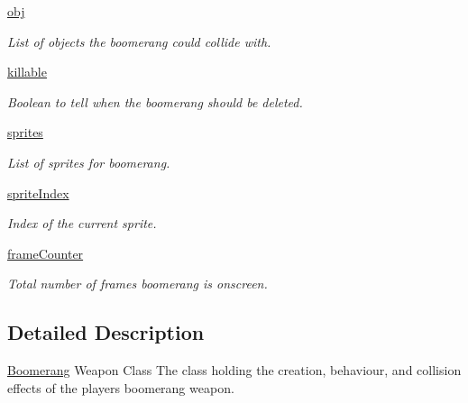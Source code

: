 \begin{DoxyCompactItemize}
\hyperlink{classactor_1_1boomerang_1_1_boomerang_a3f28b182298ed6f753bbaa2bacc50287}{obj}
\begin{DoxyCompactList}\small\item\em List of objects the boomerang could collide with. \end{DoxyCompactList}\item 
\mbox{\label{classactor_1_1boomerang_1_1_boomerang_abfb405ccedae18b49b36d5504a548aed}} 
\hyperlink{classactor_1_1boomerang_1_1_boomerang_abfb405ccedae18b49b36d5504a548aed}{killable}
\begin{DoxyCompactList}\small\item\em Boolean to tell when the boomerang should be deleted. \end{DoxyCompactList}\item 
\mbox{\label{classactor_1_1boomerang_1_1_boomerang_a54e828173053f349639a8e75b56281c6}} 
\hyperlink{classactor_1_1boomerang_1_1_boomerang_a54e828173053f349639a8e75b56281c6}{sprites}
\begin{DoxyCompactList}\small\item\em List of sprites for boomerang. \end{DoxyCompactList}\item 
\mbox{\label{classactor_1_1boomerang_1_1_boomerang_affb047b1f34deb8f68d0d6d5ee499429}} 
\hyperlink{classactor_1_1boomerang_1_1_boomerang_affb047b1f34deb8f68d0d6d5ee499429}{sprite\+Index}
\begin{DoxyCompactList}\small\item\em Index of the current sprite. \end{DoxyCompactList}\item 
\mbox{\label{classactor_1_1boomerang_1_1_boomerang_ae815f4dbc9a5e7c3d8e4596c41001c70}} 
\hyperlink{classactor_1_1boomerang_1_1_boomerang_ae815f4dbc9a5e7c3d8e4596c41001c70}{frame\+Counter}
\begin{DoxyCompactList}\small\item\em Total number of frames boomerang is onscreen. \end{DoxyCompactList}\end{DoxyCompactItemize}


\subsection{Detailed Description}
\hyperlink{classactor_1_1boomerang_1_1_boomerang}{Boomerang} Weapon Class  The class holding the creation, behaviour, and collision effects of the player\textquotesingle{}s boomerang weapon. 

